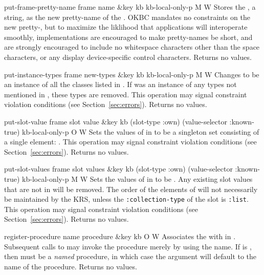 \begin{okbcop}{put-frame-pretty-name}{ frame name \&key kb kb-local-only-p} { \void } { M } { W } {  }
Stores the , a string, as the new pretty-name of the
   .  OKBC mandates no constraints on the new pretty-,
   but to maximize the liklihood that applications will interoperate smoothly,
   implementations are encouraged to make pretty-names be short, and are
   strongly encouraged to include no whitespace characters other than the space
   characters, or any display device-specific control characters.  Returns no
   values.
\end{okbcop}

\begin{okbcop}{put-instance-types}{ frame new-types \&key kb kb-local-only-p} { \void } { M } { W } {  }
Changes  to be an instance of all the classes listed in
   .  If  was an instance of any types not
   mentioned in , these types are removed.
   This operation may signal constraint violation conditions
   (see Section~\ref{sec:errors}).  Returns no values.
\end{okbcop}

\begin{okbcop}{put-slot-value}{ frame slot value \&key kb (slot-type :own) (value-selector :known-true) kb-local-only-p} { \void } { O } { W } {  }
Sets the values of  in  to be a singleton set
   consisting of a single element:  .
   This operation may signal constraint violation conditions
   (see Section~\ref{sec:errors}).  Returns no values.
\end{okbcop}

\begin{okbcop}{put-slot-values}{ frame slot values \&key kb (slot-type :own) (value-selector :known-true) kb-local-only-p} { \void } { M } { W } {  }
Sets the values of  in  to
   be .  Any existing slot values that are not in 
   will be removed.  The order of the elements
   of  will not necessarily be maintained by the KRS, unless the
   {\tt :collection-type} of the slot is {\tt :list}.
   This operation may signal constraint violation conditions
   (see Section~\ref{sec:errors}).  Returns no values.
\end{okbcop}

\begin{okbcop}{register-procedure}{ name procedure \&key kb} { \void } { O } { W } {  }
Associates the  with  in .
   Subsequent calls to  may invoke the procedure merely by
   using the name.  If  is \false, then 
   must be a {\em named} procedure, in which case the 
   argument will default to the name of the procedure.
   Returns no values.
\end{okbcop}

